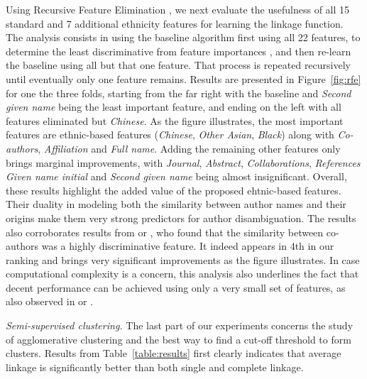 \documentclass{article}
\begin{document}
Using Recursive Feature Elimination \cite{guyon2002gene}, we next evaluate the
usefulness of all 15 standard and 7 additional ethnicity features for learning
the linkage function. The analysis consists in using the baseline algorithm
first using all 22 features, to determine the least discriminative from feature
importances \citep{louppe2013understanding}, and then re-learn the baseline
using all but that one feature. That process is repeated recursively until
eventually only one feature remains. Results are presented in
Figure~\ref{fig:rfe} for one the three folds, starting from the far right with
the baseline and \textit{Second given name} being the least important feature,
and ending on the left with all features eliminated but \textit{Chinese}. As
the figure illustrates, the most important features are ethnic-based features
(\textit{Chinese}, \textit{Other Asian}, \textit{Black}) along with
\textit{Co-authors}, \textit{Affiliation} and \textit{Full name}. Adding the remaining
other features only brings marginal improvements, with \textit{Journal},
\textit{Abstract}, \textit{Collaborations}, \textit{References} \textit{Given
name initial} and \textit{Second given name} being almost insignificant.
Overall, these results highlight the added value of the proposed ehtnic-based
features. Their duality in modeling both the similarity between author names
and their origins make them very strong predictors for author disambiguation.
The results also corroborates results from \citep{kang2009co} or \citep{ferreira2010effective}, who
found that the similarity between co-authors was a highly discriminative
feature. It indeed appears in 4th in our ranking and brings very significant
improvements as the figure illustrates. In case computational complexity is a concern, this analysis also
underlines the fact that decent performance can be achieved using only a very
small set of features, as also observed in
\citep{treeratpituk2009disambiguating} or \citep{levin2012citation}.

\textit{Semi-supervised clustering.} The last part of our experiments concerns
the study of agglomerative clustering and the best way to find a cut-off
threshold to form clusters. Results from Table~\ref{table:results}
first clearly indicates that average linkage is significantly better than
both single and complete linkage.
\end{document}
